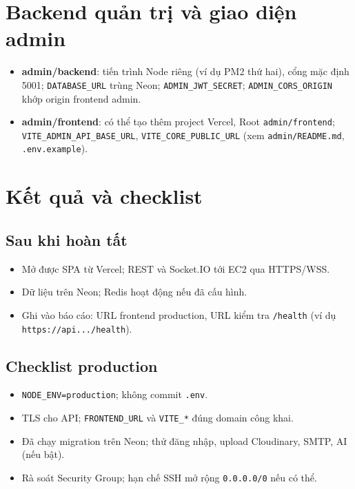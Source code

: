 \section{Backend quản trị và giao diện admin}

\begin{itemize}
    \item \textbf{admin/backend}: tiến trình Node riêng (ví dụ PM2 thứ hai), cổng mặc định 5001; \texttt{DATABASE\_URL} trùng Neon; \texttt{ADMIN\_JWT\_SECRET}; \texttt{ADMIN\_CORS\_ORIGIN} khớp origin frontend admin.
    \item \textbf{admin/frontend}: có thể tạo thêm project Vercel, Root \texttt{admin/frontend}; \texttt{VITE\_ADMIN\_API\_BASE\_URL}, \texttt{VITE\_CORE\_PUBLIC\_URL} (xem \texttt{admin/README.md}, \texttt{.env.example}).
\end{itemize}

\section{Kết quả và checklist}

\subsection{Sau khi hoàn tất}

\begin{itemize}
    \item Mở được SPA từ Vercel; REST và Socket.IO tới EC2 qua HTTPS/WSS.
    \item Dữ liệu trên Neon; Redis hoạt động nếu đã cấu hình.
    \item Ghi vào báo cáo: URL frontend production, URL kiểm tra \texttt{/health} (ví dụ \texttt{https://api.../health}).
\end{itemize}

\subsection{Checklist production}

\begin{itemize}
    \item \texttt{NODE\_ENV=production}; không commit \texttt{.env}.
    \item TLS cho API; \texttt{FRONTEND\_URL} và \texttt{VITE\_*} đúng domain công khai.
    \item Đã chạy migration trên Neon; thử đăng nhập, upload Cloudinary, SMTP, AI (nếu bật).
    \item Rà soát Security Group; hạn chế SSH mở rộng \texttt{0.0.0.0/0} nếu có thể.
\end{itemize}
